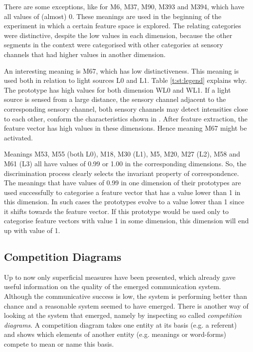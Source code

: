 There are some exceptions, like for M6, M37, M90, M393 and M394, which have all values of (almost) 0. These meanings are used in the beginning of the experiment in which a certain feature space is explored. The relating categories were distinctive, despite the low values in each dimension, because the other segments in the context were categorised with other categories at sensory channels that had higher values in another dimension.

An interesting meaning is M67, which has low distinctiveness. This meaning is used both in relation to light sources L0 and L1. Table \ref{t:st:legend} explains why. The prototype has high values for both dimension WL0 and WL1. If a light source is sensed from a large distance, the sensory channel adjacent to the corresponding sensory channel, both sensory channels may detect intensities close to each other, conform the characteristics shown in . After feature extraction, the feature vector has high values in these dimensions. Hence meaning M67 might be activated. 


Meanings M53, M55 (both L0), M18, M30 (L1), M5, M20, M27 (L2), M58 and M61 (L3) all have values of 0.99 or 1.00 in the corresponding dimensions.  So, the discrimination process clearly selects the invariant property of correspondence. The meanings that have values of 0.99 in one dimension of their prototypes are used successfully to categorise a feature vector that has a value lower than 1 in this dimension. In such cases the prototypes evolve to a value lower than 1 since it shifts towards the feature vector. If this prototype would be used only to categorise feature vectors with value 1 in some dimension, this dimension will end up with value of 1.


\subsection{Competition Diagrams}\label{s:basic:comp}

Up to now only superficial measures have been presented, which already gave useful information on the quality of the emerged communication system. Although the communicative success is low, the system is performing better than chance and a reasonable system seemed to have emerged. There is another way of looking at the system that emerged, namely by inspecting so called {\em competition diagrams}. A competition diagram takes one entity at its basis (e.g. a referent) and shows which elements of another entity (e.g. meanings or word-forms) compete to mean or name this basis.


